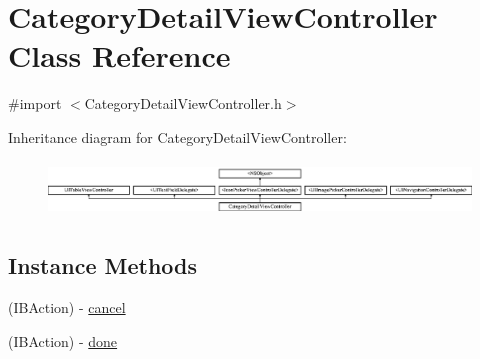 \hypertarget{interface_category_detail_view_controller}{\section{Category\-Detail\-View\-Controller Class Reference}
\label{interface_category_detail_view_controller}
}


{\ttfamily \#import $<$Category\-Detail\-View\-Controller.\-h$>$}

Inheritance diagram for Category\-Detail\-View\-Controller\-:\begin{figure}[H]
\begin{center}
\leavevmode
\includegraphics[height=1.473684cm]{interface_category_detail_view_controller}
\end{center}
\end{figure}
\subsection*{Instance Methods}
\begin{DoxyCompactItemize}
\item 
(I\-B\-Action) -\/ \hyperlink{interface_category_detail_view_controller_a6d0144b11d1a799ff7406bdd4898a04c}{cancel}
\item 
(I\-B\-Action) -\/ \hyperlink{interface_category_detail_view_controller_aabb932110323cfa64f729e1ad846a58c}{done}
\end{DoxyCompactItemize}
